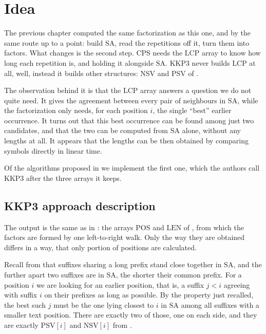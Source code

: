 \section{Idea}

The previous chapter computed the same factorization as this one, and by the same route up to a point: build \(\mathrm{SA}\), read the repetitions off it, turn them into factors. What \cite{kkp2012} changes is the second step. CPS needs the \(\mathrm{LCP}\) array to know how long each repetition is, and holding it alongside \(\mathrm{SA}\). KKP3 never builds \(\mathrm{LCP}\) at all, well, instead it builds other structures: NSV and PSV of .

The observation behind it is that the \(\mathrm{LCP}\) array answers a question we do not quite need. It gives the agreement between every pair of neighbours in \(\mathrm{SA}\), while the factorization only needs, for each position \(i\), the single \enquote{best} earlier occurrence. It turns out that this best occurrence can be found among just two candidates, and that the two can be computed from \(\mathrm{SA}\) alone, without any lengths at all. It appears that the lengths can be then obtained by comparing symbols directly in linear time.

Of the algorithms proposed in \cite{kkp2012} we implement the first one, which the authors call KKP3 after the three arrays it keeps.

\subsection{KKP3 approach description}

The output is the same as in : the arrays \(\mathrm{POS}\) and \(\mathrm{LEN}\) of , from which the factors are formed by one left-to-right walk. Only the way they are obtained differs in a way, that only portion of positions are calculated.

Recall from  that suffixes sharing a long prefix stand close together in \(\mathrm{SA}\), and the further apart two suffixes are in \(\mathrm{SA}\), the shorter their common prefix. For a position \(i\) we are looking for an earlier position, that is, a suffix \(j < i\) agreeing with suffix \(i\) on their prefixes as long as possible. By the property just recalled, the best such \(j\) must be the one lying closest to \(i\) in \(\mathrm{SA}\) among all suffixes with a smaller text position. There are exactly two of those, one on each side, and they are exactly \(\mathrm{PSV}[i]\) and \(\mathrm{NSV}[i]\) from .

